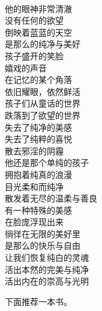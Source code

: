 \begin{poem}[纯白的灵魂]
    \begin{multicols}{3}
        \begin{center}~\\
            他的眼神非常清澈 \\ 没有任何的欲望 \\ 倒映着蓝蓝的天空 \\ 是那么的纯净与美好 \\ 孩子盛开的笑脸 \\ 嬉戏的声音 \\ 在记忆的某个角落 \\ 依旧耀眼，依然鲜活 \\ 孩子们从童话的世界 \\ 跌落到了欲望的世界 \\ 失去了纯净的美感 \\ 失去了纯粹的喜悦 \\ 散去邪淫的阴霾 \\ 他还是那个单纯的孩子 \\ 拥抱着纯真的浪漫 \\ 目光柔和而纯净 \\ 散发着无尽的温柔与善良 \\ 有一种特殊的美感 \\ 在脸庞浮现出来 \\ 徜徉在无限的美好里 \\ 是那么的快乐与自由 \\ 让我们恢复纯白的灵魂 \\ 活出本然的完美与纯净 \\ 活出内在的崇高与光明
        \end{center}
    \end{multicols}
\end{poem}

下面推荐一本书。

